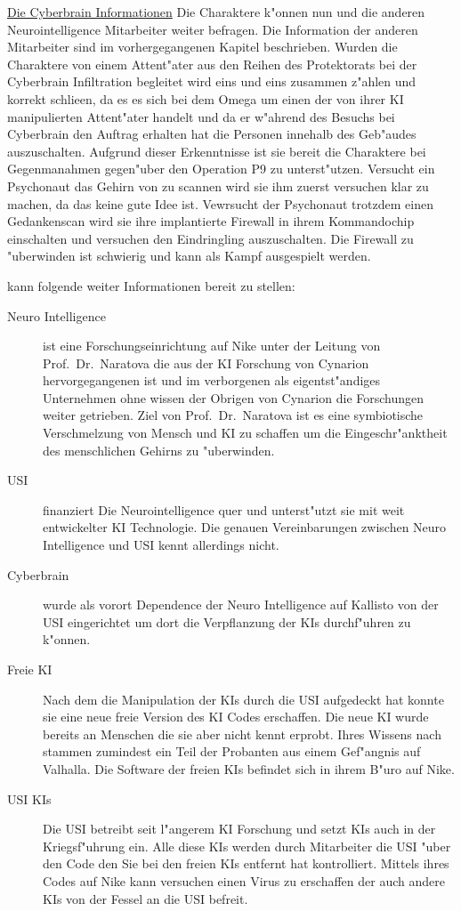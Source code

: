 \underline{Die Cyberbrain Informationen} Die Charaktere k"onnen nun \ml{} und die anderen Neurointelligence Mitarbeiter weiter befragen. Die Information der anderen Mitarbeiter sind im vorhergegangenen Kapitel beschrieben.  Wurden die Charaktere von einem Attent"ater aus den Reihen des Protektorats bei der Cyberbrain Infiltration begleitet wird \ml{} eins und eins zusammen z"ahlen und korrekt schlie\3en, da\3 es es sich bei dem Omega um einen der von ihrer KI manipulierten Attent"ater handelt und da\3 er w"ahrend des Besuchs bei Cyberbrain den Auftrag erhalten hat die Personen innehalb des Geb"audes auszuschalten. Aufgrund dieser Erkenntnisse ist sie bereit die Charaktere bei Gegenma\3nahmen gegen"uber den Operation P9 zu unterst"utzen. Versucht ein Psychonaut das Gehirn von \ml{} zu scannen wird sie ihm zuerst versuchen klar zu machen, da\3 das keine gute Idee ist. Vewrsucht der Psychonaut trotzdem einen Gedankenscan wird sie ihre implantierte Firewall in ihrem Kommandochip einschalten und versuchen den Eindringling auszuschalten. Die Firewall zu "uberwinden ist schwierig und kann als Kampf ausgespielt werden.

\ml{} kann folgende weiter Informationen bereit zu stellen:

\begin{description}
	\item[Neuro Intelligence] ist eine Forschungseinrichtung auf Nike unter der Leitung von Prof.~Dr.~Naratova die aus der KI Forschung von 	Cynarion hervorgegangenen ist und im verborgenen als eigentst"andiges Unternehmen ohne wissen der Obrigen von Cynarion die 				Forschungen weiter getrieben. Ziel von Prof.~Dr.~Naratova ist es eine symbiotische Verschmelzung von Mensch und KI zu schaffen um 		die Eingeschr"anktheit des menschlichen Gehirns zu "uberwinden.
	\item[USI] finanziert Die Neurointelligence quer und unterst"utzt sie mit weit entwickelter KI Technologie. Die genauen Vereinbarungen 
		zwischen Neuro Intelligence und USI kennt \ml{} allerdings nicht.
	\item[Cyberbrain] wurde als vorort Dependence der Neuro Intelligence auf Kallisto von der USI eingerichtet um dort die 				
		Verpflanzung der KIs durchf"uhren zu k"onnen.
	\item[Freie KI] Nach dem \ml{} die Manipulation der KIs durch die USI aufgedeckt hat konnte sie eine neue freie Version des KI Codes 	
		erschaffen. Die neue KI wurde bereits an Menschen die sie aber nicht kennt erprobt. Ihres Wissens nach stammen zumindest ein Teil der Probanten aus einem Gef"angnis auf Valhalla. Die Software der freien KIs befindet sich in ihrem B"uro auf Nike.
	\item[USI KIs] Die USI betreibt seit l"angerem KI Forschung und setzt KIs auch in der Kriegsf"uhrung ein. Alle diese KIs werden 
		durch Mitarbeiter die USI "uber den Code den Sie bei den freien KIs entfernt hat kontrolliert. Mittels ihres Codes auf Nike kann \ml{} versuchen einen Virus zu erschaffen der auch andere KIs von der Fessel an die USI befreit.
\end{description}

